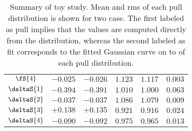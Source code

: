 \begin{table}[!h]
\begin{tabular}{c c c c c | c}
    $                   \fS{4}$ & $-0.025$ & $-0.026$ & $1.123$ & $1.117$  & $0.003$ \\
    $               \deltaS{1}$ & $-0.394$ & $-0.391$ & $1.010$ & $1.000$  & $0.063$ \\
    $               \deltaS{2}$ & $-0.037$ & $-0.037$ & $1.086$ & $1.079$  & $0.009$ \\
    $               \deltaS{3}$ & $+0.138$ & $+0.135$ & $0.921$ & $0.916$  & $0.024$ \\
    $               \deltaS{4}$ & $-0.090$ & $-0.092$ & $0.975$ & $0.965$  & $0.013$ \\
  \end{tabular}
  \caption{Summary of toy study. Mean and rms of each pull distribution is shown for two case.
           The first labeled as pull implies that the values are computed directly from the distribution,
           whereas the second labeled as fit corresponds to the fitted Gaussian curve on to of each pull distribution.}
  \label{pull_table}
\end{table}
